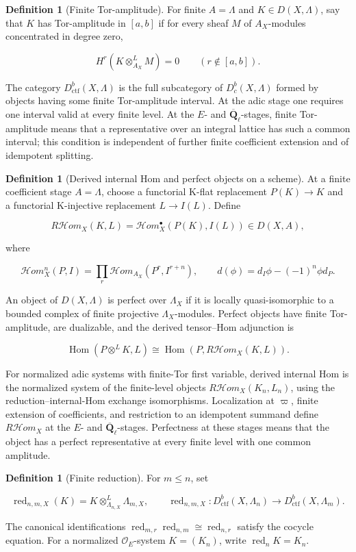 \documentclass[10pt]{article}
\theoremstyle{definition}
\newtheorem{definition}[theorem]{Definition}
\newcommand{\Qlb}{\overline{\mathbf Q}_\ell}
\newcommand{\OO}{\mathcal O}
\newcommand{\Dbc}{D^b_c}
\newcommand{\Dctf}{D^b_{\mathrm{ctf}}}
\newcommand{\RHom}{R\mathcal Hom}
\newcommand{\red}{\operatorname{red}}
\begin{document}
\begin{definition}[Finite Tor-amplitude]
For finite \(A=\Lambda\) and \(K\in D(X,\Lambda)\), say that \(K\) has
Tor-amplitude in \([a,b]\) if for
every sheaf \(M\) of \(A_X\)-modules concentrated in degree zero,

\[
 H^r(K\otimes^L_{A_X}M)=0\qquad(r\notin[a,b]).
\]

The category \(\Dctf(X,\Lambda)\) is the full subcategory of
\(\Dbc(X,\Lambda)\) formed by objects having some finite Tor-amplitude
interval.  At the adic stage one requires one interval valid at every finite
level.  At the \(E\)- and \(\Qlb\)-stages, finite Tor-amplitude means that a
representative over an integral lattice has such a common interval; this
condition is independent of further finite coefficient extension and of
idempotent splitting.
\end{definition}

\begin{definition}[Derived internal Hom and perfect objects on a scheme]
At a finite coefficient stage \(A=\Lambda\), choose a functorial K-flat
replacement \(P(K)\to K\) and a functorial K-injective replacement
\(L\to I(L)\).  Define

\[
 \RHom_X(K,L)=
 \mathcal Hom_X^\bullet(P(K),I(L))\in D(X,A),
\]

where

\[
 \mathcal Hom_X^n(P,I)=
 \prod_r\mathcal Hom_{A_X}(P^r,I^{r+n}),
 \qquad d(\phi)=d_I\phi-(-1)^n\phi d_P.
\]

An object of \(D(X,\Lambda)\) is perfect over \(\Lambda_X\) if it is locally
quasi-isomorphic to a bounded complex of finite projective
\(\Lambda_X\)-modules.  Perfect objects have finite Tor-amplitude, are dualizable,
and the derived tensor--Hom adjunction is

\[
 \operatorname{Hom}(P\otimes^LK,L)
 \cong\operatorname{Hom}(P,\RHom_X(K,L)).
\]

For normalized adic systems with finite-Tor first variable, derived internal
Hom is the normalized system of the finite-level objects
\(\RHom_X(K_n,L_n)\), using the reduction--internal-Hom exchange
isomorphisms.  Localization at \(\varpi\), finite extension of coefficients,
and restriction to an idempotent summand define \(\RHom_X\) at the \(E\)- and
\(\Qlb\)-stages.  Perfectness at these stages means that the object has a
perfect representative at every finite level with one common amplitude.
\end{definition}

\begin{definition}[Finite reduction]
For \(m\leq n\), set

\[
 \red_{n,m,X}(K)=K\otimes^L_{\Lambda_{n,X}}\Lambda_{m,X},
 \qquad
 \red_{n,m,X}:\Dctf(X,\Lambda_n)\longrightarrow
 \Dctf(X,\Lambda_m).
\]

The canonical identifications
\(\red_{m,r}\red_{n,m}\cong\red_{n,r}\) satisfy the cocycle equation.
For a normalized \(\OO_E\)-system \(K=(K_n)\), write
\(\red_nK=K_n\).
\end{definition}
\end{document}
